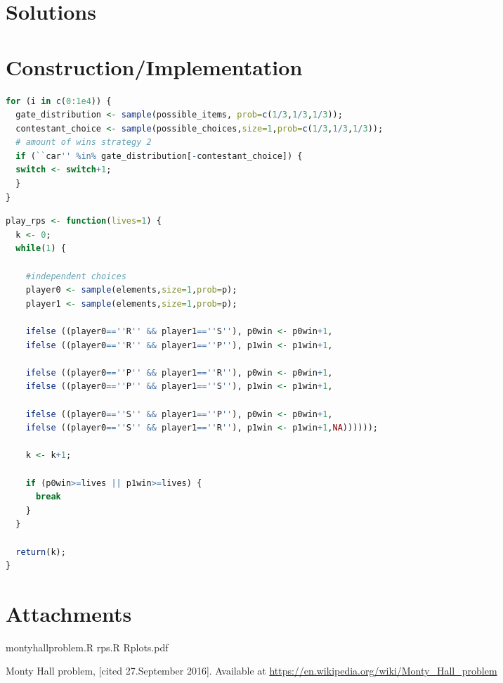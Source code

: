 \documentclass[a4paper, 11pt]{article}
\begin{document}
\section*{Solutions}

\newpage
\section*{Construction/Implementation}
\begin{lstlisting}[caption={Simulation of "swtich" strategy in Monty Hall problem},label={lst:keepmonty},language=R]
for (i in c(0:1e4)) {
  gate_distribution <- sample(possible_items, prob=c(1/3,1/3,1/3));
  contestant_choice <- sample(possible_choices,size=1,prob=c(1/3,1/3,1/3));
  # amount of wins strategy 2
  if (``car'' %in% gate_distribution[-contestant_choice]) {
  switch <- switch+1;
  }
}
\end{lstlisting}

\begin{lstlisting}[caption={Number of trials needed to finish the game given k lives},label={lst:ntrials},language=R]
play_rps <- function(lives=1) {
  k <- 0;
  while(1) {

    #independent choices
    player0 <- sample(elements,size=1,prob=p);
    player1 <- sample(elements,size=1,prob=p);

    ifelse ((player0==''R'' && player1==''S''), p0win <- p0win+1,
    ifelse ((player0==''R'' && player1==''P''), p1win <- p1win+1,

    ifelse ((player0==''P'' && player1==''R''), p0win <- p0win+1,
    ifelse ((player0==''P'' && player1==''S''), p1win <- p1win+1,

    ifelse ((player0==''S'' && player1==''P''), p0win <- p0win+1,
    ifelse ((player0==''S'' && player1==''R''), p1win <- p1win+1,NA))))));

    k <- k+1;

    if (p0win>=lives || p1win>=lives) {
      break
    }
  }

  return(k);
}
\end{lstlisting}


\section*{Attachments}

montyhallproblem.R rps.R Rplots.pdf

\begin{thebibliography}{9}
  
  Monty Hall problem, [cited 27.September 2016]. Available at \url{https://en.wikipedia.org/wiki/Monty_Hall_problem}

\end{thebibliography}
\end{document}
